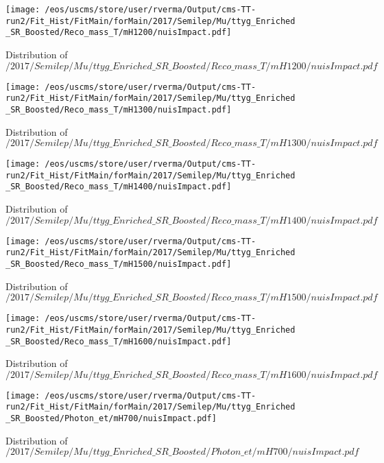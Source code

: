 \begin{figure}
\centering
\texttt{[image: /eos/uscms/store/user/rverma/Output/cms-TT-run2/Fit\_Hist/FitMain/forMain/2017/Semilep/Mu/ttyg\_Enriched\_SR\_Boosted/Reco\_mass\_T/mH1200/nuisImpact.pdf]}
\caption{Distribution of $/2017/Semilep/Mu/ttyg\_Enriched\_SR\_Boosted/Reco\_mass\_T/mH1200/nuisImpact.pdf$}
\end{figure}

\begin{figure}
\centering
\texttt{[image: /eos/uscms/store/user/rverma/Output/cms-TT-run2/Fit\_Hist/FitMain/forMain/2017/Semilep/Mu/ttyg\_Enriched\_SR\_Boosted/Reco\_mass\_T/mH1300/nuisImpact.pdf]}
\caption{Distribution of $/2017/Semilep/Mu/ttyg\_Enriched\_SR\_Boosted/Reco\_mass\_T/mH1300/nuisImpact.pdf$}
\end{figure}

\begin{figure}
\centering
\texttt{[image: /eos/uscms/store/user/rverma/Output/cms-TT-run2/Fit\_Hist/FitMain/forMain/2017/Semilep/Mu/ttyg\_Enriched\_SR\_Boosted/Reco\_mass\_T/mH1400/nuisImpact.pdf]}
\caption{Distribution of $/2017/Semilep/Mu/ttyg\_Enriched\_SR\_Boosted/Reco\_mass\_T/mH1400/nuisImpact.pdf$}
\end{figure}

\begin{figure}
\centering
\texttt{[image: /eos/uscms/store/user/rverma/Output/cms-TT-run2/Fit\_Hist/FitMain/forMain/2017/Semilep/Mu/ttyg\_Enriched\_SR\_Boosted/Reco\_mass\_T/mH1500/nuisImpact.pdf]}
\caption{Distribution of $/2017/Semilep/Mu/ttyg\_Enriched\_SR\_Boosted/Reco\_mass\_T/mH1500/nuisImpact.pdf$}
\end{figure}

\begin{figure}
\centering
\texttt{[image: /eos/uscms/store/user/rverma/Output/cms-TT-run2/Fit\_Hist/FitMain/forMain/2017/Semilep/Mu/ttyg\_Enriched\_SR\_Boosted/Reco\_mass\_T/mH1600/nuisImpact.pdf]}
\caption{Distribution of $/2017/Semilep/Mu/ttyg\_Enriched\_SR\_Boosted/Reco\_mass\_T/mH1600/nuisImpact.pdf$}
\end{figure}

\begin{figure}
\centering
\texttt{[image: /eos/uscms/store/user/rverma/Output/cms-TT-run2/Fit\_Hist/FitMain/forMain/2017/Semilep/Mu/ttyg\_Enriched\_SR\_Boosted/Photon\_et/mH700/nuisImpact.pdf]}
\caption{Distribution of $/2017/Semilep/Mu/ttyg\_Enriched\_SR\_Boosted/Photon\_et/mH700/nuisImpact.pdf$}
\end{figure}

